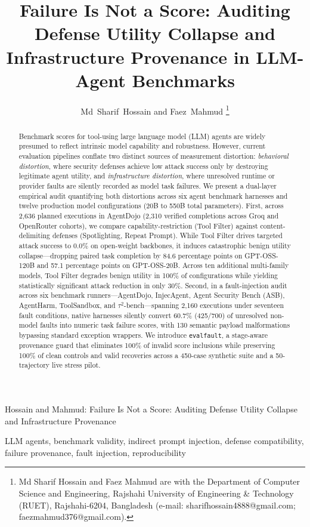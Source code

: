 \documentclass[journal]{IEEEtran}
\title{Failure Is Not a Score: Auditing Defense Utility Collapse and Infrastructure Provenance in LLM-Agent Benchmarks}
\author{Md~Sharif~Hossain and Faez~Mahmud%
\thanks{Md Sharif Hossain and Faez Mahmud are with the Department of Computer Science and Engineering, Rajshahi University of Engineering \& Technology (RUET), Rajshahi-6204, Bangladesh (e-mail: sharifhossain4888@gmail.com; faezmahmud376@gmail.com).}}
\begin{document}
\maketitle

%
{Hossain and Mahmud: Failure Is Not a Score: Auditing Defense Utility Collapse and Infrastructure Provenance}

\begin{abstract}
Benchmark scores for tool-using large language model (LLM) agents are widely presumed to reflect intrinsic model capability and robustness. However, current evaluation pipelines conflate two distinct sources of measurement distortion: \textit{behavioral distortion}, where security defenses achieve low attack success only by destroying legitimate agent utility, and \textit{infrastructure distortion}, where unresolved runtime or provider faults are silently recorded as model task failures. We present a dual-layer empirical audit quantifying both distortions across six agent benchmark harnesses and twelve production model configurations (20B to 550B total parameters). First, across 2,636 planned executions in AgentDojo (2,310 verified completions across Groq and OpenRouter cohorts), we compare capability-restriction (Tool Filter) against content-delimiting defenses (Spotlighting, Repeat Prompt). While Tool Filter drives targeted attack success to 0.0\% on open-weight backbones, it induces catastrophic benign utility collapse---dropping paired task completion by 84.6 percentage points on GPT-OSS-120B and 57.1 percentage points on GPT-OSS-20B. Across ten additional multi-family models, Tool Filter degrades benign utility in 100\% of configurations while yielding statistically significant attack reduction in only 30\%. Second, in a fault-injection audit across six benchmark runners---AgentDojo, InjecAgent, Agent Security Bench (ASB), AgentHarm, ToolSandbox, and $\tau^2$-bench---spanning 2,160 executions under seventeen fault conditions, native harnesses silently convert 60.7\% (425/700) of unresolved non-model faults into numeric task failure scores, with 130 semantic payload malformations bypassing standard exception wrappers. We introduce \texttt{evalfault}, a stage-aware provenance guard that eliminates 100\% of invalid score inclusions while preserving 100\% of clean controls and valid recoveries across a 450-case synthetic suite and a 50-trajectory live stress pilot.
\end{abstract}

\begin{IEEEkeywords}
LLM agents, benchmark validity, indirect prompt injection, defense compatibility, failure provenance, fault injection, reproducibility
\end{IEEEkeywords}
\end{document}

